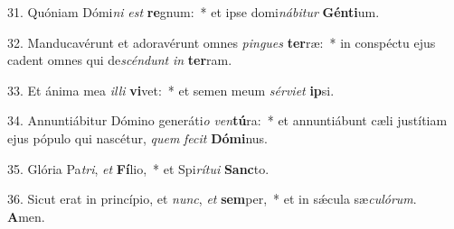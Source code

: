 31. Quóniam Dómi\textit{ni} \textit{est} \textbf{re}gnum:~*  et ipse domi\textit{ná}\textit{bi}\textit{tur} \textbf{Gén}\textbf{ti}um.\

32. Manducavérunt et adoravérunt omnes \textit{pin}\textit{gues} \textbf{ter}ræ:~*  in conspéctu ejus cadent omnes qui de\textit{scén}\textit{dunt} \textit{in} \textbf{ter}ram.\

33. Et ánima mea \textit{il}\textit{li} \textbf{vi}vet:~*  et semen meum \textit{sér}\textit{vi}\textit{et} \textbf{ip}si.\

34. Annuntiábitur Dómino generáti\textit{o} \textit{ven}\textbf{tú}ra:~*  et annuntiábunt cæli justítiam ejus pópulo qui nascétur, \textit{quem} \textit{fe}\textit{cit} \textbf{Dó}\textbf{mi}nus.\

35. Glória Pa\textit{tri}, \textit{et} \textbf{Fí}lio,~*  et Spi\textit{rí}\textit{tu}\textit{i} \textbf{Sanc}to.\

36. Sicut erat in princípio, et \textit{nunc}, \textit{et} \textbf{sem}per,~*  et in sǽcula sæ\textit{cu}\textit{ló}\textit{rum}. \textbf{A}men.\

